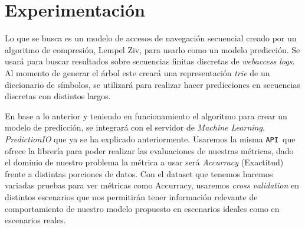 \chapter[Experimentación]{Experimentación}\label{ch:experimetal-all}





{
}

Lo que se busca es un modelo de accesos de navegación secuencial creado por un algoritmo de compresión, Lempel Ziv,  para usarlo como un modelo  predicción. Se usará para buscar resultados sobre secuencias finitas discretas de \emph{webaccess logs}. Al momento de generar el árbol este creará una representación \emph{trie} de un diccionario de símbolos, se utilizará para realizar hacer predicciones en secuencias discretas con distintos largos.

En base a lo anterior y teniendo en funcionamiento el algoritmo para crear un modelo de predicción, se integrará con el servidor de \emph{Machine Learning, PredictionIO} que ya se ha explicado anteriormente. Usaremos la misma \texttt{API }que ofrece la librería para poder realizar las evaluaciones de nuestras métricas, dado el dominio de nuestro problema la métrica a usar será \emph{Accurracy} (Exactitud) frente a distintas porciones de datos. Con el dataset que tenemos haremos variadas pruebas para ver métricas como Accurracy, usaremos \emph{cross validation} en distintos escenarios que nos permitirán tener información relevante de comportamiento de nuestro modelo propuesto en escenarios ideales como en escenarios reales.


